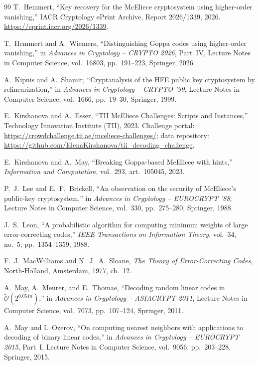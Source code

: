 \documentclass[11pt,a4paper]{article}
\theoremstyle{definition}
\theoremstyle{remark}
\begin{document}
\begin{thebibliography}{99}
T.~Hemmert,
``Key recovery for the McEliece cryptosystem using higher-order vanishing,'' IACR Cryptology ePrint Archive, Report 2026/1339, 2026. \url{https://eprint.iacr.org/2026/1339}.

T.~Hemmert and A.~Wiemers,
``Distinguishing Goppa codes using higher-order vanishing,'' in \emph{Advances in Cryptology -- CRYPTO 2026}, Part~IV, Lecture Notes in Computer Science, vol.~16803, pp.~191--223, Springer, 2026.

A.~Kipnis and A.~Shamir,
``Cryptanalysis of the HFE public key cryptosystem by relinearization,'' in \emph{Advances in Cryptology -- CRYPTO '99}, Lecture Notes in Computer Science, vol.~1666, pp.~19--30, Springer, 1999.

E.~Kirshanova and A.~Esser,
``TII McEliece Challenges: Scripts and Instances,'' Technology Innovation Institute (TII), 2023. Challenge portal: \url{https://crowdchallenge.tii.ae/mceliece-challenges/}; data repository: \url{https://github.com/ElenaKirshanova/tii_decoding_challenge}.

E.~Kirshanova and A.~May,
``Breaking Goppa-based McEliece with hints,'' \emph{Information and Computation}, vol.~293, art.~105045, 2023.

P.~J.~Lee and E.~F.~Brickell,
``An observation on the security of McEliece's public-key cryptosystem,'' in \emph{Advances in Cryptology -- EUROCRYPT '88}, Lecture Notes in Computer Science, vol.~330, pp.~275--280, Springer, 1988.

J.~S.~Leon,
``A probabilistic algorithm for computing minimum weights of large error-correcting codes,'' \emph{IEEE Transactions on Information Theory}, vol.~34, no.~5, pp.~1354--1359, 1988.

F.~J.~MacWilliams and N.~J.~A.~Sloane,
\emph{The Theory of Error-Correcting Codes}, North-Holland, Amsterdam, 1977, ch.~12.

A.~May, A.~Meurer, and E.~Thomae,
``Decoding random linear codes in $\tilde{\mathcal{O}}(2^{0.054n})$,'' in \emph{Advances in Cryptology -- ASIACRYPT 2011}, Lecture Notes in Computer Science, vol.~7073, pp.~107--124, Springer, 2011.

A.~May and I.~Ozerov,
``On computing nearest neighbors with applications to decoding of binary linear codes,'' in \emph{Advances in Cryptology -- EUROCRYPT 2015}, Part~I, Lecture Notes in Computer Science, vol.~9056, pp.~203--228, Springer, 2015.


\end{thebibliography}
\end{document}
